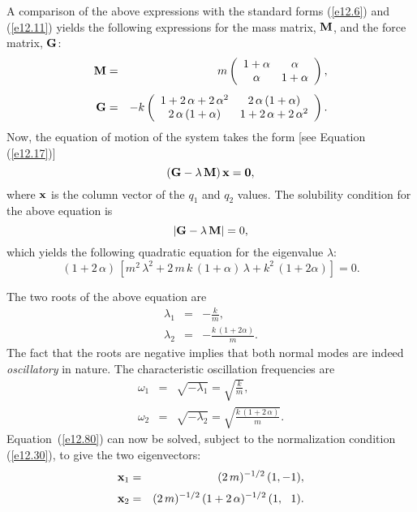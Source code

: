 A comparison of the above expressions with the standard
forms (\ref{e12.6}) and (\ref{e12.11}) yields the following
expressions for the mass matrix, ${\bf M}$, and the force matrix, ${\bf G}$:
\begin{eqnarray}
{\bf M} &=& m\left(
\begin{array}{cc}
1+\alpha& \alpha\\
\alpha& 1+\alpha\end{array}
\right),\\[1ex]
{\bf G} &=& -k\left(\begin{array}{cc}
1+2\,\alpha+2\,\alpha^2& 2\,\alpha\,(1+\alpha)\\
2\,\alpha\,(1+\alpha)&1+2\,\alpha+2\,\alpha^2 \end{array}\right).
\end{eqnarray}
Now, the equation of motion of the system takes the form [see Equation (\ref{e12.17})]
\begin{equation}\label{e12.80}
({\bf G} -\lambda\,{\bf M})\,{\bf x} = {\bf 0},
\end{equation}
where ${\bf x}$ is the column vector of the $q_1$ and $q_2$ values.
The solubility condition for the above equation is
\begin{equation}
\left|{\bf G} - \lambda\,{\bf M}\right| = 0,
\end{equation}
which yields the following quadratic equation for the eigenvalue $\lambda$:
\begin{equation}
(1+2\,\alpha)\,\left[m^2\,\lambda^2 + 2\,m\,k\,(1+\alpha)\,\lambda + k^2\,(1+2\alpha)\right] = 0.
\end{equation}

The two roots of the above equation are
\begin{eqnarray}
\lambda_1 &=& - \frac{k}{m},\\[0.5ex]
\lambda_2 &=& - \frac{k\,(1+2\alpha)}{m}.
\end{eqnarray}
The fact that the roots are negative implies that both normal modes are indeed
{\em oscillatory} in nature. The characteristic oscillation frequencies are
\begin{eqnarray}\label{e12.85}
\omega_1 &=& \sqrt{-\lambda_1} = \sqrt{\frac{k}{m}},\\[0.5ex]
\omega_2 &=& \sqrt{-\lambda_2} = \sqrt{\frac{k\,(1+2\,\alpha)}{m}}.
\end{eqnarray}
Equation~(\ref{e12.80}) can now be solved, subject to the normalization
condition (\ref{e12.30}), to give the two eigenvectors:
\begin{eqnarray}
{\bf x}_1 &=& (2\,m)^{-1/2}\,(1,-1),\\[0.5ex]
{\bf x}_2 &=& (2\,m)^{-1/2}\,(1+2\,\alpha)^{-1/2}\,(1,\,\,\,\,1).\label{e12.88}
\end{eqnarray}

